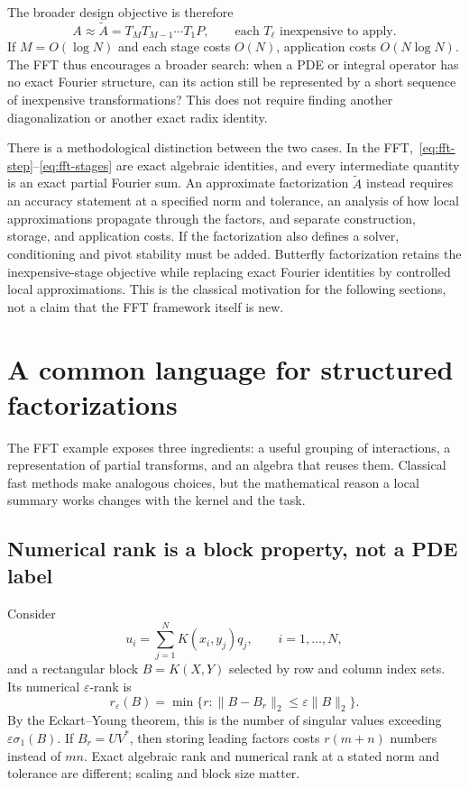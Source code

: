 \documentclass[11pt,a4paper]{article}
\newcommand{\eps}{\varepsilon}
\begin{document}
The broader design objective is therefore
\begin{equation}
 A\approx \widetilde A=T_MT_{M-1}\cdots T_1P,
 \qquad\text{each }T_\ell\text{ inexpensive to apply}.
 \label{eq:factor-design}
\end{equation}
If $M=O(\log N)$ and each stage costs $O(N)$, application costs $O(N\log N)$. The FFT thus encourages a broader search: when a PDE or integral operator has no exact Fourier structure, can its action still be represented by a short sequence of inexpensive transformations? This does not require finding another diagonalization or another exact radix identity.

There is a methodological distinction between the two cases. In the FFT,~\eqref{eq:fft-step}--\eqref{eq:fft-stages} are exact algebraic identities, and every intermediate quantity is an exact partial Fourier sum. An approximate factorization $\widetilde A$ instead requires an accuracy statement at a specified norm and tolerance, an analysis of how local approximations propagate through the factors, and separate construction, storage, and application costs. If the factorization also defines a solver, conditioning and pivot stability must be added. Butterfly factorization retains the inexpensive-stage objective while replacing exact Fourier identities by controlled local approximations. This is the classical motivation for the following sections, not a claim that the FFT framework itself is new.

\section{A common language for structured factorizations}
\label{sec:framework}

The FFT example exposes three ingredients: a useful grouping of interactions, a representation of partial transforms, and an algebra that reuses them. Classical fast methods make analogous choices, but the mathematical reason a local summary works changes with the kernel and the task.

\subsection{Numerical rank is a block property, not a PDE label}
Consider
\begin{equation}
 u_i=\sum_{j=1}^N K(x_i,y_j)q_j,\qquad i=1,\ldots,N,
 \label{eq:pairwise}
\end{equation}
and a rectangular block $B=K(X,Y)$ selected by row and column index sets. Its numerical $\eps$-rank is
\begin{equation}
 r_\eps(B)=\min\{r:\|B-B_r\|_2\le\eps\|B\|_2\}.
 \label{eq:numericalrank}
\end{equation}
By the Eckart--Young theorem, this is the number of singular values exceeding $\eps\sigma_1(B)$. If $B_r=UV^*$, then storing leading factors costs $r(m+n)$ numbers instead of $mn$. Exact algebraic rank and numerical rank at a stated norm and tolerance are different; scaling and block size matter.
\end{document}
